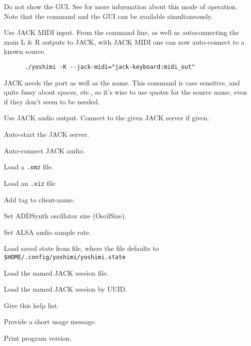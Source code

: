       Do not show the GUI.  See  for more
      information about this mode of operation.  Note that the command and the
      GUI can be available simultaneously.

      Use JACK MIDI input.
      From the command line, as well as autoconnecting the main L \& R
      outputs to JACK, with JACK MIDI one can now auto-connect to a known source.

   \begin{verbatim}
      ./yoshimi -K --jack-midi="jack-keyboard:midi_out"
   \end{verbatim}
   
   JACK needs the port as well as the name.
   This command is case sensitive, and quite fussy about spaces, etc.,
   so it's wise to use quotes for the source name, even if they don't seem to
   be needed.

      Use JACK audio output.
      Connect to the given JACK server if given.

      Auto-start the JACK server.

      Auto-connect JACK audio.

      Load a \texttt{.xmz} file.

      Load an \texttt{.xiz} file

      Add tag to client-name.

      Set ADDSynth oscillator size (OscilSize).

      Set ALSA audio sample rate.

      Load saved state from file, where the file defaults to
      \texttt{\$HOME/.config/yoshimi/yoshimi.state}

      Load the named JACK session file.

      Load the named JACK session by UUID.

      Give this help list.

      Provide a short usage message.

      Print program version.

